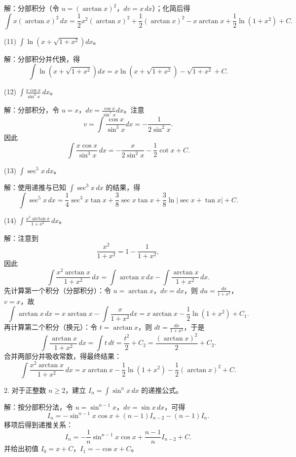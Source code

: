 解：分部积分（令 \(u=(\arctan x)^{2}\)，\(dv=x\,dx\)）；化简后得
\[ \int x(\arctan x)^{2}\,dx=\frac{1}{2}x^{2}(\arctan x)^{2}+\frac{1}{2}(\arctan x)^{2}-x\arctan x+\frac{1}{2}\ln(1+x^{2})+C. \]

(11) \(\int\ln\left(x+\sqrt{1+x^{2}}\right)dx\)。

解：分部积分并代换，得
\[ \int\ln\left(x+\sqrt{1+x^{2}}\right)dx=x\ln\left(x+\sqrt{1+x^{2}}\right)-\sqrt{1+x^{2}}+C. \]

(12) \(\int\frac{x\cos x}{\sin^{3}x}\,dx\)。

解：分部积分，令 \(u=x\)，\(dv=\frac{\cos x}{\sin^{3}x}dx\)。注意
\[ v=\int\frac{\cos x}{\sin^{3}x}dx=-\frac{1}{2\sin^{2}x}. \]
因此
\[ \int\frac{x\cos x}{\sin^{3}x}\,dx=-\frac{x}{2\sin^{2}x}-\frac{1}{2}\cot x+C. \]

(13) \(\int\sec^{5}x\,dx\)。

解：使用递推与已知 \(\int\sec^{3}x\,dx\) 的结果，得
\[ \int\sec^{5}x\,dx=\frac{1}{4}\sec^{3}x\tan x+\frac{3}{8}\sec x\tan x+\frac{3}{8}\ln|\sec x+\tan x|+C. \]

(14) \(\int\frac{x^{2}\arctan x}{1+x^{2}}\,dx\)。

解：注意到
\[ \frac{x^{2}}{1+x^{2}}=1-\frac{1}{1+x^{2}}, \]
因此
\[ \int\frac{x^{2}\arctan x}{1+x^{2}}\,dx=\int\arctan x\,dx-\int\frac{\arctan x}{1+x^{2}}\,dx. \]
先计算第一个积分（分部积分）：令 \(u=\arctan x\)，\(dv=dx\)，则 \(du=\frac{dx}{1+x^{2}}\)，\(v=x\)，故
\[ \int\arctan x\,dx=x\arctan x-\int\frac{x}{1+x^{2}}dx=x\arctan x-\frac{1}{2}\ln(1+x^{2})+C_1. \]
再计算第二个积分（换元）：令 \(t=\arctan x\)，则 \(dt=\frac{dx}{1+x^{2}}\)，于是
\[ \int\frac{\arctan x}{1+x^{2}}\,dx=\int t\,dt=\frac{t^{2}}{2}+C_2=\frac{(\arctan x)^{2}}{2}+C_2. \]
合并两部分并吸收常数，得最终结果：
\[ \int\frac{x^{2}\arctan x}{1+x^{2}}\,dx=x\arctan x-\frac{1}{2}\ln(1+x^{2})-\frac{1}{2}(\arctan x)^{2}+C. \]

2. 对于正整数 \(n\ge 2\)，建立 \(I_n=\int\sin^{n}x\,dx\) 的递推公式。

解：按分部积分法，令 \(u=\sin^{n-1}x\)，\(dv=\sin x\,dx\)，可得
\[ I_n=-\sin^{n-1}x\cos x+(n-1)I_{n-2}-(n-1)I_n. \]
移项后得到递推关系：
\[ I_n=-\frac{1}{n}\sin^{n-1}x\cos x+\frac{n-1}{n}I_{n-2}+C. \]
并给出初值 \(I_0=x+C\)，\(I_1=-\cos x+C\)。
